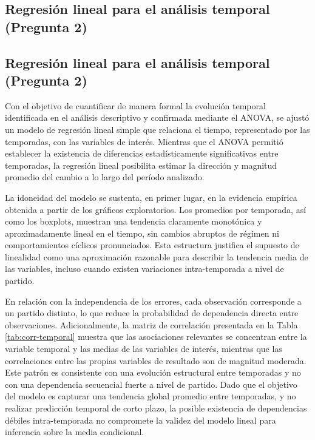 \documentclass[12pt]{article}
\begin{document}
\subsection{Regresión lineal para el análisis temporal (Pregunta 2)}
\label{subsec:pregunta2-regresion}

\subsection{Regresión lineal para el análisis temporal (Pregunta 2)}
\label{subsec:pregunta2-regresion}

Con el objetivo de cuantificar de manera formal la evolución temporal identificada en el
análisis descriptivo y confirmada mediante el ANOVA, se ajustó un modelo de regresión lineal
simple que relaciona el tiempo, representado por las temporadas, con las variables de
interés. Mientras que el ANOVA permitió establecer la existencia de diferencias
estadísticamente significativas entre temporadas, la regresión lineal posibilita estimar la
dirección y magnitud promedio del cambio a lo largo del período analizado.

La idoneidad del modelo se sustenta, en primer lugar, en la evidencia empírica obtenida a
partir de los gráficos exploratorios. Los promedios por temporada, así como los boxplots,
muestran una tendencia claramente monotónica y aproximadamente lineal en el tiempo, sin
cambios abruptos de régimen ni comportamientos cíclicos pronunciados. Esta estructura
justifica el supuesto de linealidad como una aproximación razonable para describir la
tendencia media de las variables, incluso cuando existen variaciones intra-temporada a nivel
de partido.

En relación con la independencia de los errores, cada observación corresponde a un partido distinto, 
lo que reduce la probabilidad de dependencia directa entre observaciones. Adicionalmente, la matriz de 
correlación presentada en la Tabla \ref{tab:corr-temporal} muestra que las asociaciones relevantes se 
concentran entre la variable temporal y las medias de las variables de interés, mientras que las correlaciones 
entre las propias variables de resultado son de magnitud moderada. Este patrón es consistente con una 
evolución estructural entre temporadas y no con una dependencia secuencial fuerte a nivel de partido. 
Dado que el objetivo del modelo es capturar una tendencia global promedio entre temporadas, y no realizar 
predicción temporal de corto plazo, la posible existencia de dependencias débiles intra-temporada no compromete 
la validez del modelo lineal para inferencia sobre la media condicional.
\end{document}

